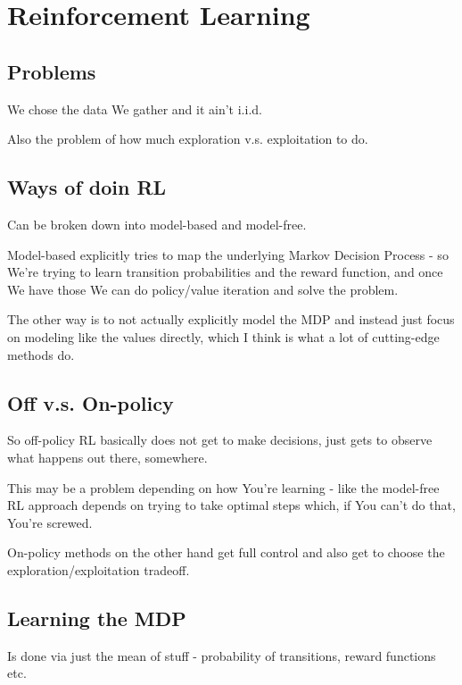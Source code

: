 \documentclass{article}
\begin{document}
\section{Reinforcement Learning}
		
	\subsection{Problems}
	
		We chose the data We gather and it ain't i.i.d.
		
		Also the problem of how much exploration v.s. exploitation to do.
		
	\subsection{Ways of doin RL}
	
		Can be broken down into model-based and model-free.
		
		Model-based explicitly tries to map the underlying Markov Decision Process - so We're trying to learn transition probabilities and the reward function, and once We have those We can do policy/value iteration and solve the problem.
		
		The other way is to not actually explicitly model the MDP and instead just focus on modeling like the values directly, which I think is what a lot of cutting-edge methods do.
		
	\subsection{Off v.s. On-policy}
	
		So off-policy RL basically does not get to make decisions, just gets to observe what happens out there, somewhere.
		
		This may be a problem depending on how You're learning - like the model-free RL approach depends on trying to take optimal steps which, if You can't do that, You're screwed.
		
		On-policy methods on the other hand get full control and also get to choose the exploration/exploitation tradeoff.
		
	\subsection{Learning the MDP}
	
		Is done via just the mean of stuff - probability of transitions, reward functions etc.
		
\end{document}

